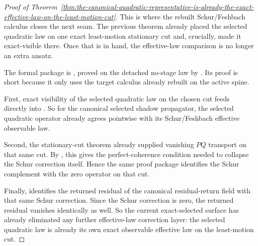 \begin{proof}[Proof of Theorem~\ref{thm:the-canonical-quadratic-representative-is-already-the-exact-effective-law-on-the-least-motion-cut}]
\label{proof:thm:the-canonical-quadratic-representative-is-already-the-exact-effective-law-on-the-least-motion-cut}
This is where the rebuilt Schur/Feshbach calculus closes the next seam. The
previous theorem already placed the selected quadratic law on one exact
least-motion stationary cut and, crucially, made it exact-visible there. Once
that is in hand, the effective-law comparison is no longer an extra ansatz.

The formal package is
, proved on the
detached no-stage law by
.
Its proof is short because it only uses the target calculus already rebuilt on
the active spine.

First, exact visibility of the selected quadratic law on the chosen cut feeds
directly into . So for the canonical
selected shadow propagator, the selected quadratic operator already agrees
pointwise with its Schur/Feshbach effective observable law.

Second, the stationary-cut theorem already supplied vanishing \(PQ\)
transport on that same cut. By , this gives the
perfect-coherence condition needed to collapse the Schur correction itself.
Hence the same proof package identifies the Schur complement with the zero
operator on that cut.

Finally,  identifies the returned residual of
the canonical residual-return field with that same Schur correction. Since the
Schur correction is zero, the returned residual vanishes identically as well.
So the current exact-selected surface has already eliminated any further
effective-law correction layer: the selected quadratic law is already its own
exact observable effective law on the least-motion cut.
\end{proof}

